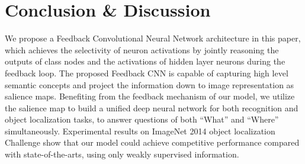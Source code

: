 \section{Conclusion \& Discussion}
\label{sec:conclusion}

We propose a Feedback Convolutional Neural Network architecture in this paper, which achieves the selectivity of neuron activations by jointly reasoning the outputs of class nodes and the activations of hidden layer neurons during the feedback loop. The proposed Feedback CNN is capable of capturing high level semantic concepts and project the information down to image representation as salience maps. Benefiting from the feedback mechanism of our model, we utilize the salience map to build a unified deep neural network for both recognition and object localization tasks, to answer questions of both ``What'' and ``Where'' simultaneously. Experimental results on ImageNet 2014 object localization Challenge show that our model could achieve competitive performance compared with state-of-the-arts, using only weakly supervised information.



